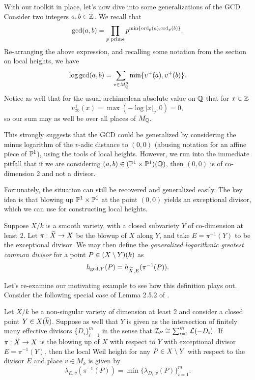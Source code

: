 With our toolkit in place, let's now dive into some generalizations of the GCD.
Consider two integers $a, b \in \mathbb{Z}$.
We recall that
\[
    \gcd(a, b) = \prod_{p \text{ prime}} p^{\min\{{\rm ord}_p(a), {\rm ord}_p(b)\}}.
\]
Re-arranging the above expression, and recalling some notation from the section on local heights, we have
\[
    \log \gcd(a, b) = \sum_{v \in M_{\mathbb{Q}}^0} \min\{v^+(a), v^+(b)\}.
\]
Notice as well that for the usual archimedean absolute value on $\mathbb{Q}$ that for $x \in \mathbb{Z}$
\[
    v_\infty^+(x) = \max(-\log |x|_v, 0) = 0,
\]
so our sum may as well be over all places of $M_{\mathbb{Q}}$.

This strongly suggests that the GCD could be generalized by considering the minus logarithm of the $v$-adic distance to $(0, 0)$
(abusing notation for an affine piece of $\mathbb{P}^1$),
using the tools of local heights.
However, we run into the immediate pitfall that if we are considering $(a, b) \in (\mathbb{P}^1 \times \mathbb{P}^1)(\mathbb{Q})$,
then $(0, 0)$ is of co-dimension 2 and not a divisor.

Fortunately, the situation can still be recovered and generalized easily.
The key idea is that blowing up $\mathbb{P}^1 \times \mathbb{P}^1$ at the point $(0, 0)$ yields an exceptional divisor,
which we can use for constructing local heights.

\begin{definition}
    Suppose $X/k$ is a smooth variety, with a closed subvariety $Y$ of co-dimension at least 2.
    Let $\pi : \widetilde X \to X$ be the blowup of $X$ along $Y$, 
    and take $E = \pi^{-1}(Y)$ to be the exceptional divisor.
    We may then define the \textit{generalized logarithmic greatest common divisor} for a point $P \in (X \setminus Y)(k)$ as
    \[
        h_{\gcd, Y}(P) = h_{\widetilde X, E}(\pi^{-1}(P)).
    \]
\end{definition}

Let's re-examine our motivating example to see how this definition plays out.
Consider the following special case of Lemma 2.5.2 of \cite{Vojta_2006}.

\begin{lemma}
    Let $X/k$ be a non-singular variety of dimension at least 2 and consider a closed point $Y \in X(\overline{k})$.
    Suppose as well that $Y$ is given as the intersection of finitely many effective divisors $\{D_i\}_{i = 1}^m$ in the sense that $\mathcal{I}_P \cong \sum_{i = 1}^m \mathcal{L}(-D_i)$.
    If $\pi : \widetilde X \to X$ is the blowing up of $X$ with respect to $Y$ with exceptional divisor $E = \pi^{-1}(Y)$,
    then the local Weil height for any $P \in X \setminus Y$ with respect to the divisor $E$ and place $v \in M_k$ is given by
    \[
        \lambda_{E, v}(\pi^{-1}(P)) = \min\{\lambda_{D_i, v}(P)\}_{i = 1}^m.
    \]
\end{lemma}

